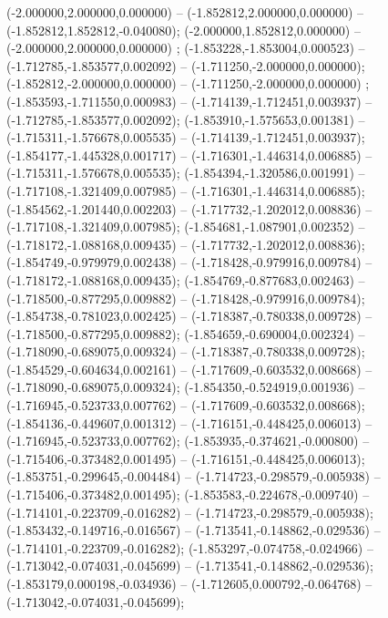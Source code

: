  (-2.000000,2.000000,0.000000) -- (-1.852812,2.000000,0.000000) -- (-1.852812,1.852812,-0.040080);
 (-2.000000,1.852812,0.000000) -- (-2.000000,2.000000,0.000000) ;
 (-1.853228,-1.853004,0.000523) -- (-1.712785,-1.853577,0.002092) -- (-1.711250,-2.000000,0.000000);
 (-1.852812,-2.000000,0.000000) -- (-1.711250,-2.000000,0.000000) ;
 (-1.853593,-1.711550,0.000983) -- (-1.714139,-1.712451,0.003937) -- (-1.712785,-1.853577,0.002092);
 (-1.853910,-1.575653,0.001381) -- (-1.715311,-1.576678,0.005535) -- (-1.714139,-1.712451,0.003937);
 (-1.854177,-1.445328,0.001717) -- (-1.716301,-1.446314,0.006885) -- (-1.715311,-1.576678,0.005535);
 (-1.854394,-1.320586,0.001991) -- (-1.717108,-1.321409,0.007985) -- (-1.716301,-1.446314,0.006885);
 (-1.854562,-1.201440,0.002203) -- (-1.717732,-1.202012,0.008836) -- (-1.717108,-1.321409,0.007985);
 (-1.854681,-1.087901,0.002352) -- (-1.718172,-1.088168,0.009435) -- (-1.717732,-1.202012,0.008836);
 (-1.854749,-0.979979,0.002438) -- (-1.718428,-0.979916,0.009784) -- (-1.718172,-1.088168,0.009435);
 (-1.854769,-0.877683,0.002463) -- (-1.718500,-0.877295,0.009882) -- (-1.718428,-0.979916,0.009784);
 (-1.854738,-0.781023,0.002425) -- (-1.718387,-0.780338,0.009728) -- (-1.718500,-0.877295,0.009882);
 (-1.854659,-0.690004,0.002324) -- (-1.718090,-0.689075,0.009324) -- (-1.718387,-0.780338,0.009728);
 (-1.854529,-0.604634,0.002161) -- (-1.717609,-0.603532,0.008668) -- (-1.718090,-0.689075,0.009324);
 (-1.854350,-0.524919,0.001936) -- (-1.716945,-0.523733,0.007762) -- (-1.717609,-0.603532,0.008668);
 (-1.854136,-0.449607,0.001312) -- (-1.716151,-0.448425,0.006013) -- (-1.716945,-0.523733,0.007762);
 (-1.853935,-0.374621,-0.000800) -- (-1.715406,-0.373482,0.001495) -- (-1.716151,-0.448425,0.006013);
 (-1.853751,-0.299645,-0.004484) -- (-1.714723,-0.298579,-0.005938) -- (-1.715406,-0.373482,0.001495);
 (-1.853583,-0.224678,-0.009740) -- (-1.714101,-0.223709,-0.016282) -- (-1.714723,-0.298579,-0.005938);
 (-1.853432,-0.149716,-0.016567) -- (-1.713541,-0.148862,-0.029536) -- (-1.714101,-0.223709,-0.016282);
 (-1.853297,-0.074758,-0.024966) -- (-1.713042,-0.074031,-0.045699) -- (-1.713541,-0.148862,-0.029536);
 (-1.853179,0.000198,-0.034936) -- (-1.712605,0.000792,-0.064768) -- (-1.713042,-0.074031,-0.045699);
